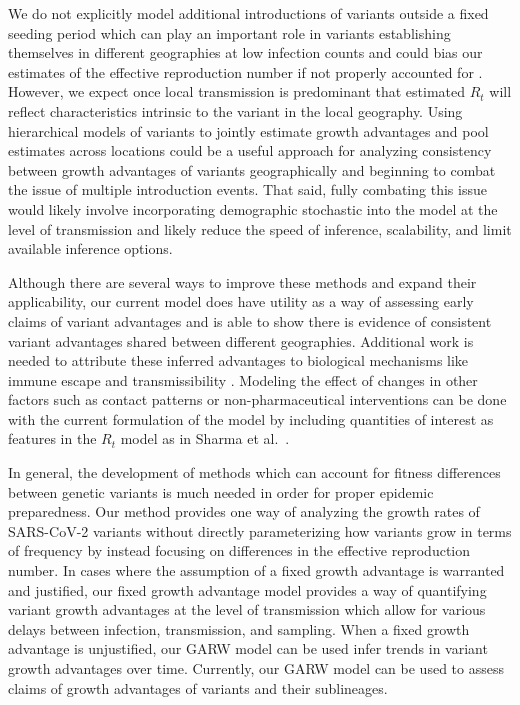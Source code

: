 \documentclass[11pt,oneside,letterpaper]{article}
\begin{document}
We do not explicitly model additional introductions of variants outside a fixed seeding period which can play an important role in variants establishing themselves in different geographies at low infection counts and could bias our estimates of the effective reproduction number if not properly accounted for \cite{Cori2013, MullerWagner2021}.
However, we expect once local transmission is predominant that estimated $R_{t}$ will reflect characteristics intrinsic to the variant in the local geography.
Using hierarchical models of variants to jointly estimate growth advantages and pool estimates across locations could be a useful approach for analyzing consistency between growth advantages of variants geographically and beginning to combat the issue of multiple introduction events.
That said, fully combating this issue would likely involve incorporating demographic stochastic into the model at the level of transmission and likely reduce the speed of inference, scalability, and limit available inference options.

Although there are several ways to improve these methods and expand their applicability, our current model does have utility as a way of assessing early claims of variant advantages and is able to show there is evidence of consistent variant advantages shared between different geographies.
Additional work is needed to attribute these inferred advantages to biological mechanisms like immune escape and transmissibility \cite{tao2021biological}.
Modeling the effect of changes in other factors such as contact patterns or non-pharmaceutical interventions can be done with the current formulation of the model by including quantities of interest as features in the $R_{t}$ model as in Sharma et al.\ \cite{Sharma2021}.

In general, the development of methods which can account for fitness differences between genetic variants is much needed in order for proper epidemic preparedness.
Our method provides one way of analyzing the growth rates of SARS-CoV-2 variants without directly parameterizing how variants grow in terms of frequency by instead focusing on differences in the effective reproduction number.
In cases where the assumption of a fixed growth advantage is warranted and justified, our fixed growth advantage model provides a way of quantifying variant growth advantages at the level of transmission which allow for various delays between infection, transmission, and sampling.
When a fixed growth advantage is unjustified, our GARW model can be used infer trends in variant growth advantages over time.
Currently, our GARW model can be used to assess claims of growth advantages of variants and their sublineages.
\end{document}
